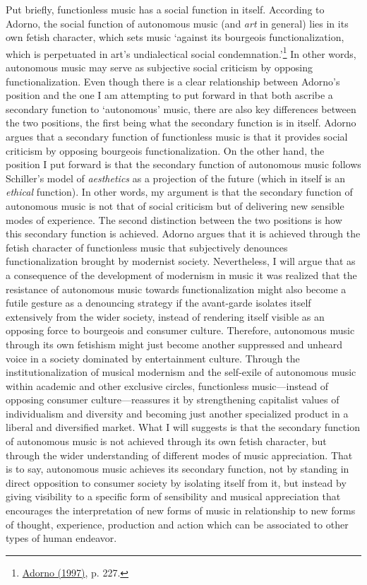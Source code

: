Put briefly, functionless music has a social function in itself. According to Adorno, the social function of autonomous music (and \emph{art} in general) lies in its own fetish character, which sets music `against its bourgeois functionalization, which is perpetuated in art's undialectical social condemnation.'\footnote{\hyperlink{adornoaesth}{Adorno (1997)}, p. 227.} In other words, autonomous music may serve as subjective social criticism by opposing functionalization. Even though there is a clear relationship between Adorno's position and the one I am attempting to put forward in that both ascribe a secondary function to `autonomous' music, there are also key differences between the two positions, the first being what the secondary function is in itself. Adorno argues that a secondary function of functionless music is that it provides social criticism by opposing bourgeois functionalization. On the other hand, the position I put forward is that the secondary function of autonomous music follows Schiller's model of \emph{aesthetics} as a projection of the future (which in itself is an \emph{ethical} function). In other words, my argument is that the secondary function of autonomous music is not that of social criticism but of delivering new sensible modes of experience. The second distinction between the two positions is how this secondary function is achieved. Adorno argues that it is achieved through the fetish character of functionless music that subjectively denounces functionalization brought by modernist society. Nevertheless, I will argue that as a consequence of the development of modernism in music it was realized that the resistance of autonomous music towards functionalization might also become a futile gesture as a denouncing strategy if the avant-garde isolates itself extensively from the wider society, instead of rendering itself visible as an opposing force to bourgeois and consumer culture. Therefore, autonomous music through its own fetishism might just become another suppressed and unheard voice in a society dominated by entertainment culture. Through the institutionalization of musical modernism and the self-exile of autonomous music within academic and other exclusive circles, functionless music---instead of opposing consumer culture---reassures it by strengthening capitalist values of individualism and diversity and becoming just another specialized product in a liberal and diversified market. What I will suggests is that the secondary function of autonomous music is not achieved through its own fetish character, but through the wider understanding of different modes of music appreciation. That is to say, autonomous music achieves its secondary function, not by standing in direct opposition to consumer society by isolating itself from it, but instead by giving visibility to a specific form of sensibility and musical appreciation that encourages the interpretation of new forms of music in relationship to new forms of thought, experience, production and action which can be associated to other types of human endeavor.

